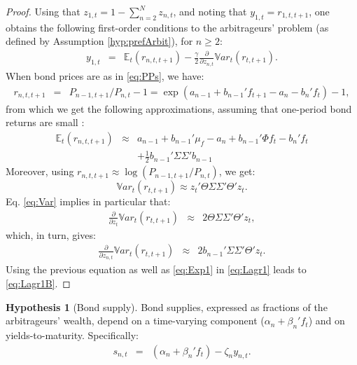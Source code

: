 \documentclass[
  12pt,
]{book}
\theoremstyle{definition}
\theoremstyle{definition}
\theoremstyle{definition}
\theoremstyle{definition}
\newtheorem{hypothesis}{Hypothesis}[chapter]
\theoremstyle{remark}
\begin{document}
\begin{proof}
Using that \(z_{1,t} = 1 - \sum_{n=2}^{N}z_{n,t}\), and noting that \(y_{1,t}=r_{1,t,t+1}\), one obtains the following first-order conditions to the arbitrageurs' problem (as defined by Assumption \ref{hyp:prefArbit}), for \(n \ge 2\):
\begin{eqnarray}
y_{1,t} &=& \mathbb{E}_t(r_{n,t,t+1}) - \frac{\gamma}{2} \frac{\partial}{\partial z_{n,t}} \mathbb{V}ar_t(r_{t,t+1}). \label{eq:Lagr1}
\end{eqnarray}
When bond prices are as in \eqref{eq:PPs}, we have:
\begin{eqnarray*}
r_{n,t,t+1} &=& P_{n-1,t+1}/P_{n,t}-1 = \exp(a_{n-1} + b_{n-1}'f_{t+1} - a_{n} - b_{n}'f_{t})-1,
\end{eqnarray*}
from which we get the following approximations, assuming that one-period bond returns are small \citep{Hamilton_Wu_2012}:
\begin{eqnarray}
\mathbb{E}_t(r_{n,t,t+1}) &\approx&  a_{n-1} + b_{n-1}'\mu_f  - a_{n} + b_{n-1}'\Phi f_t - b_{n}'f_{t}\nonumber\\
&&+ \frac{1}{2}b_{n-1}'\Sigma \Sigma'b_{n-1} \label{eq:Exp1}
\end{eqnarray}
Moreover, using \(r_{n,t,t+1} \approx \log(P_{n-1,t+1}/P_{n,t})\), we get:
\begin{equation}
\mathbb{V}ar_t(r_{t,t+1}) \approx z_t'\Theta\Sigma\Sigma'\Theta' z_t.\label{eq:Var}
\end{equation}
Eq. \eqref{eq:Var} implies in particular that:
\begin{eqnarray*}
\frac{\partial}{\partial z_t} \mathbb{V}ar_t(r_{t,t+1}) &\approx& 2 \Theta\Sigma\Sigma'\Theta' z_t,
\end{eqnarray*}
which, in turn, gives:
\begin{eqnarray*}
\frac{\partial}{\partial z_{n,t}} \mathbb{V}ar_t(r_{t,t+1}) &\approx& 2 b_{n-1}'\Sigma\Sigma'\Theta' z_t.
\end{eqnarray*}
Using the previous equation as well as \eqref{eq:Exp1} in \eqref{eq:Lagr1} leads to \eqref{eq:Lagr1B}.
\end{proof}

\begin{hypothesis}[Bond supply]
\protect\hypertarget{hyp:supply}{}\label{hyp:supply}Bond supplies, expressed as fractions of the arbitrageurs' wealth, depend on a time-varying component (\(\alpha_n + \beta_n' f_t\)) and on yields-to-maturity. Specifically:
\begin{eqnarray}
s_{n,t} &=& (\alpha_n + {\beta_n}' f_t) - \zeta_n y_{n,t}. \label{eq:supply1}
\end{eqnarray}
\end{hypothesis}
\end{document}
